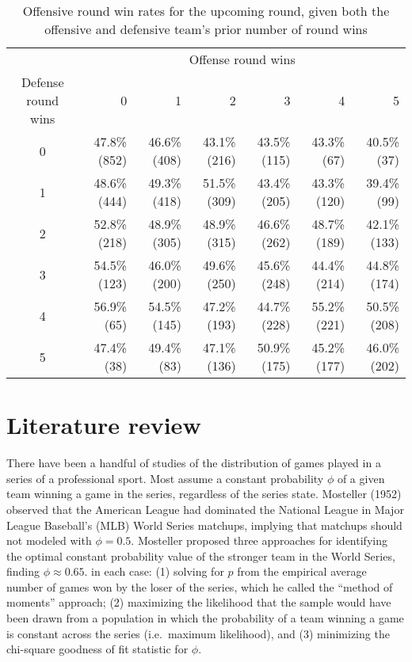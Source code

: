 \documentclass{article}
\begin{document}
\begin{longtable}{crrrrrr}
\caption{Offensive round win rates for the upcoming round, given both the offensive and defensive team's prior number of round wins}\label{tbl:cod-o-win-prop-by-series-state} \\
\toprule
& \multicolumn{6}{c}{Offense round wins} \\ 
\cmidrule(lr){2-7}
Defense round wins & 0 & 1 & 2 & 3 & 4 & 5 \\ 
\midrule
0 & 47.8\%
(852) & 46.6\%
(408) & 43.1\%
(216) & 43.5\%
(115) & 43.3\%
(67) & 40.5\%
(37) \\ 
1 & 48.6\%
(444) & 49.3\%
(418) & 51.5\%
(309) & 43.4\%
(205) & 43.3\%
(120) & 39.4\%
(99) \\ 
2 & 52.8\%
(218) & 48.9\%
(305) & 48.9\%
(315) & 46.6\%
(262) & 48.7\%
(189) & 42.1\%
(133) \\ 
3 & 54.5\%
(123) & 46.0\%
(200) & 49.6\%
(250) & 45.6\%
(248) & 44.4\%
(214) & 44.8\%
(174) \\ 
4 & 56.9\%
(65) & 54.5\%
(145) & 47.2\%
(193) & 44.7\%
(228) & 55.2\%
(221) & 50.5\%
(208) \\ 
5 & 47.4\%
(38) & 49.4\%
(83) & 47.1\%
(136) & 50.9\%
(175) & 45.2\%
(177) & 46.0\%
(202) \\ 
\bottomrule
\end{longtable}

\hypertarget{literature-review}{%
\section{Literature review}\label{literature-review}}

There have been a handful of studies of the distribution of games played
in a series of a professional sport. Most assume a constant probability
\(\phi\) of a given team winning a game in the series, regardless of the
series state. Mosteller (1952) observed that the American League had
dominated the National League in Major League Baseball's (MLB) World
Series matchups, implying that matchups should not modeled with
\(\phi = 0.5\). Mosteller proposed three approaches for identifying the
optimal constant probability value of the stronger team in the World
Series, finding \(\phi \approx 0.65\). in each case: (1) solving for
\(p\) from the empirical average number of games won by the loser of the
series, which he called the ``method of moments'' approach; (2)
maximizing the likelihood that the sample would have been drawn from a
population in which the probability of a team winning a game is constant
across the series (i.e.~maximum likelihood), and (3) minimizing the
chi-square goodness of fit statistic for \(\phi\).
\end{document}
